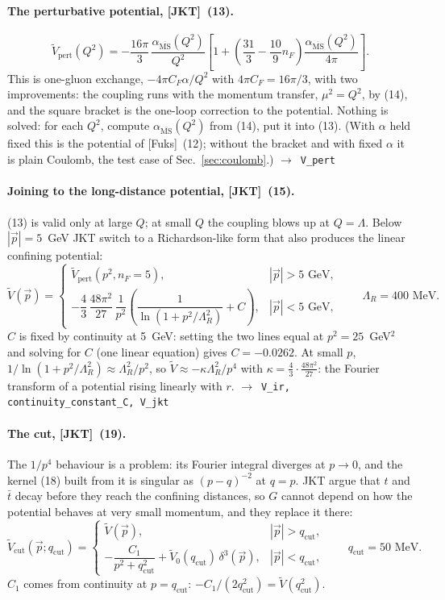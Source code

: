 \documentclass[11pt]{article}
\newcommand{\code}[1]{\texttt{#1}}
\newcommand{\JKT}{[JKT]}
\newcommand{\Fuks}{[Fuks]}
\newcommand{\qc}{q_\mathrm{cut}}
\newcommand{\MS}{\overline{\mathrm{MS}}}
\newcommand{\fn}[1]{\hfill$\to$~\code{#1}}
\begin{document}
\paragraph{The perturbative potential, \JKT\ (13).}
$$
\tilde V_\mathrm{pert}(Q^2)=-\frac{16\pi}{3}\,\frac{\alpha_{\MS}(Q^2)}{Q^2}
\left[1+\left(\frac{31}{3}-\frac{10}{9}n_F\right)\frac{\alpha_{\MS}(Q^2)}{4\pi}\right].
$$
This is one-gluon exchange, $-4\pi C_F\alpha/Q^2$ with $4\pi C_F=16\pi/3$, with two improvements: the coupling runs with the
momentum transfer, $\mu^2=Q^2$, by (14), and the square bracket is the one-loop correction to the potential. Nothing is
solved: for each $Q^2$, compute $\alpha_{\MS}(Q^2)$ from (14), put it into (13). (With $\alpha$ held fixed this is the
potential of \Fuks\ (12); without the bracket and with fixed $\alpha$ it is plain Coulomb, the test case of
Sec.~\ref{sec:coulomb}.)
\fn{V\_pert}

\paragraph{Joining to the long-distance potential, \JKT\ (15).}
(13) is valid only at large $Q$; at small $Q$ the coupling blows up at $Q=\Lambda$. Below $|\vec p|=5$~GeV JKT switch to a
Richardson-like form that also produces the linear confining potential:
$$
\tilde V(\vec p)=\begin{cases}\tilde V_\mathrm{pert}(p^2,n_F=5), & |\vec p|>5\text{ GeV},\\[4pt]
-\dfrac43\,\dfrac{48\pi^2}{27}\,\dfrac{1}{p^2}\left(\dfrac{1}{\ln(1+p^2/\Lambda_R^2)}+C\right), & |\vec p|<5\text{ GeV},\end{cases}
\qquad\Lambda_R=400\text{ MeV}.
$$
$C$ is fixed by continuity at 5~GeV: setting the two lines equal at $p^2=25$~GeV$^2$ and solving for $C$ (one linear
equation) gives $C=-0.0262$. At small $p$, $1/\ln(1+p^2/\Lambda_R^2)\approx\Lambda_R^2/p^2$, so
$\tilde V\approx-\kappa\Lambda_R^2/p^4$ with $\kappa=\tfrac43\cdot\tfrac{48\pi^2}{27}$: the Fourier transform of a potential
rising linearly with $r$.
\fn{V\_ir, continuity\_constant\_C, V\_jkt}

\paragraph{The cut, \JKT\ (19).}
\label{sec:cut}
The $1/p^4$ behaviour is a problem: its Fourier integral diverges at $p\to0$, and the kernel (18) built from it is singular as
$(p-q)^{-2}$ at $q=p$. JKT argue that $t$ and $\bar t$ decay before they reach the confining distances, so $G$ cannot depend on
how the potential behaves at very small momentum, and they replace it there:
$$
\tilde V_\mathrm{cut}(\vec p;\qc)=\begin{cases}\tilde V(\vec p), & |\vec p|>\qc,\\[2pt]
-\dfrac{C_1}{p^2+\qc^2}+\tilde V_0(\qc)\,\delta^3(\vec p), & |\vec p|<\qc,\end{cases}\qquad \qc=50\text{ MeV}.
$$
$C_1$ comes from continuity at $p=\qc$: $-C_1/(2\qc^2)=\tilde V(\qc^2)$.
\end{document}
